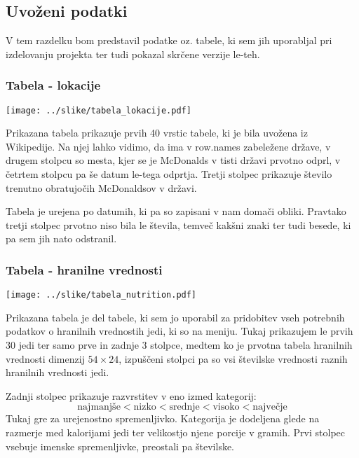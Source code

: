\documentclass[11pt,a4paper]{article}
\begin{document}
\subsection{Uvoženi podatki}

V tem razdelku bom predstavil podatke oz. tabele, ki sem jih uporabljal pri izdelovanju projekta ter tudi pokazal skrčene verzije le-teh.

\newpage
\subsubsection{Tabela - lokacije}
\vspace{5mm}
\texttt{[image: ../slike/tabela\_lokacije.pdf]}
\vspace{5mm}

Prikazana tabela prikazuje prvih 40 vrstic tabele, ki je bila uvožena iz Wikipedije. Na njej lahko vidimo, da ima v row.names zabeležene države, v drugem stolpcu so mesta, kjer se
je McDonalds v tisti državi prvotno odprl, v četrtem stolpcu pa še datum le-tega odprtja. Tretji stolpec prikazuje število trenutno obratujočih McDonaldsov v državi. \par

Tabela je urejena po datumih, ki pa so zapisani v nam domači obliki. Pravtako tretji stolpec prvotno niso bila le števila, temveč kakšni znaki ter tudi besede, ki pa sem jih nato odstranil.

\subsubsection{Tabela - hranilne vrednosti}
\vspace{5mm}
\texttt{[image: ../slike/tabela\_nutrition.pdf]}
\vspace{5mm}

Prikazana tabela je del tabele, ki sem jo uporabil za pridobitev vseh potrebnih podatkov o hranilnih vrednostih jedi, ki so na meniju. Tukaj prikazujem le prvih 30 jedi ter samo prve in zadnje 3 stolpce, medtem ko je prvotna tabela hranilnih vrednosti dimenzij $54\times24$, izpuščeni stolpci pa so vsi številske vrednosti raznih hranilnih vrednosti jedi. \par

Zadnji stolpec prikazuje razvrstitev v eno izmed kategorij: $$\mbox{najmanjše} < \mbox{nizko} < \mbox{srednje} < \mbox{visoko} < \mbox{največje}$$
Tukaj gre za urejenostno spremenljivko. Kategorija je dodeljena glede na razmerje med kalorijami jedi ter velikostjo njene porcije v gramih.
Prvi stolpec vsebuje imenske spremenljivke, preostali pa številske.
\end{document}
